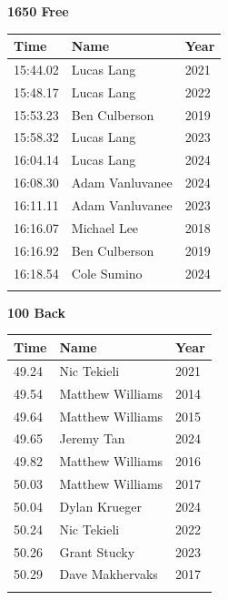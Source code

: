 \vspace{1.2em}
\noindent\begin{minipage}[t]{0.48\textwidth}
\centering
\textbf{\textcolor{teamprimary}{1650 Free}}\par
\vspace{0.5em}
\centering
\small
\renewcommand{\arraystretch}{1.0}
\setlength{\tabcolsep}{4pt}
\begin{tabular}{@{}p{1.8cm}p{3.0cm}p{1.0cm}@{}}
\toprule
\textbf{Time} & \textbf{Name} & \textbf{Year} \\
\midrule
15:44.02 & Lucas Lang & 2021 \\
15:48.17 & Lucas Lang & 2022 \\
15:53.23 & Ben Culberson & 2019 \\
15:58.32 & Lucas Lang & 2023 \\
16:04.14 & Lucas Lang & 2024 \\
16:08.30 & Adam Vanluvanee & 2024 \\
16:11.11 & Adam Vanluvanee & 2023 \\
16:16.07 & Michael Lee & 2018 \\
16:16.92 & Ben Culberson & 2019 \\
16:18.54 & Cole Sumino & 2024 \\
\bottomrule
\vspace{0.5em}
\end{tabular}
\end{minipage}
\hfill
\begin{minipage}[t]{0.48\textwidth}
\centering
\textbf{\textcolor{teamprimary}{100 Back}}\par
\vspace{0.5em}
\centering
\small
\renewcommand{\arraystretch}{1.0}
\setlength{\tabcolsep}{4pt}
\begin{tabular}{@{}p{1.8cm}p{3.0cm}p{1.0cm}@{}}
\toprule
\textbf{Time} & \textbf{Name} & \textbf{Year} \\
\midrule
49.24 & Nic Tekieli & 2021 \\
49.54 & Matthew Williams & 2014 \\
49.64 & Matthew Williams & 2015 \\
49.65 & Jeremy Tan & 2024 \\
49.82 & Matthew Williams & 2016 \\
50.03 & Matthew Williams & 2017 \\
50.04 & Dylan Krueger & 2024 \\
50.24 & Nic Tekieli & 2022 \\
50.26 & Grant Stucky & 2023 \\
50.29 & Dave Makhervaks & 2017 \\
\bottomrule
\vspace{0.5em}
\end{tabular}
\end{minipage}
